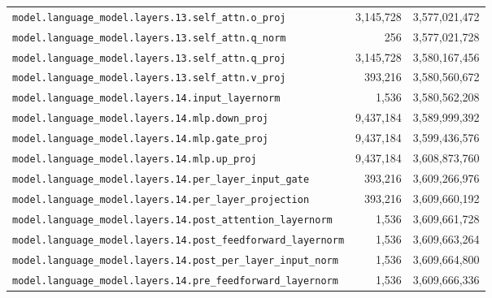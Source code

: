 \documentclass[10pt,a4paper]{article}
\theoremstyle{definition}
\begin{document}
\begin{appendices}
\begin{longtable}{p{9.5cm}rr}
\texttt{model.\allowbreak{}language\_model.\allowbreak{}layers.\allowbreak{}13.\allowbreak{}self\_attn.\allowbreak{}o\_proj} & 3,145,728 & 3,577,021,472 \\
\texttt{model.\allowbreak{}language\_model.\allowbreak{}layers.\allowbreak{}13.\allowbreak{}self\_attn.\allowbreak{}q\_norm} & 256 & 3,577,021,728 \\
\texttt{model.\allowbreak{}language\_model.\allowbreak{}layers.\allowbreak{}13.\allowbreak{}self\_attn.\allowbreak{}q\_proj} & 3,145,728 & 3,580,167,456 \\
\texttt{model.\allowbreak{}language\_model.\allowbreak{}layers.\allowbreak{}13.\allowbreak{}self\_attn.\allowbreak{}v\_proj} & 393,216 & 3,580,560,672 \\
\texttt{model.\allowbreak{}language\_model.\allowbreak{}layers.\allowbreak{}14.\allowbreak{}input\_layernorm} & 1,536 & 3,580,562,208 \\
\texttt{model.\allowbreak{}language\_model.\allowbreak{}layers.\allowbreak{}14.\allowbreak{}mlp.\allowbreak{}down\_proj} & 9,437,184 & 3,589,999,392 \\
\texttt{model.\allowbreak{}language\_model.\allowbreak{}layers.\allowbreak{}14.\allowbreak{}mlp.\allowbreak{}gate\_proj} & 9,437,184 & 3,599,436,576 \\
\texttt{model.\allowbreak{}language\_model.\allowbreak{}layers.\allowbreak{}14.\allowbreak{}mlp.\allowbreak{}up\_proj} & 9,437,184 & 3,608,873,760 \\
\texttt{model.\allowbreak{}language\_model.\allowbreak{}layers.\allowbreak{}14.\allowbreak{}per\_layer\_input\_gate} & 393,216 & 3,609,266,976 \\
\texttt{model.\allowbreak{}language\_model.\allowbreak{}layers.\allowbreak{}14.\allowbreak{}per\_layer\_projection} & 393,216 & 3,609,660,192 \\
\texttt{model.\allowbreak{}language\_model.\allowbreak{}layers.\allowbreak{}14.\allowbreak{}post\_attention\_layernorm} & 1,536 & 3,609,661,728 \\
\texttt{model.\allowbreak{}language\_model.\allowbreak{}layers.\allowbreak{}14.\allowbreak{}post\_feedforward\_layernorm} & 1,536 & 3,609,663,264 \\
\texttt{model.\allowbreak{}language\_model.\allowbreak{}layers.\allowbreak{}14.\allowbreak{}post\_per\_layer\_input\_norm} & 1,536 & 3,609,664,800 \\
\texttt{model.\allowbreak{}language\_model.\allowbreak{}layers.\allowbreak{}14.\allowbreak{}pre\_feedforward\_layernorm} & 1,536 & 3,609,666,336 \\

\end{longtable}
\end{appendices}
\end{document}
